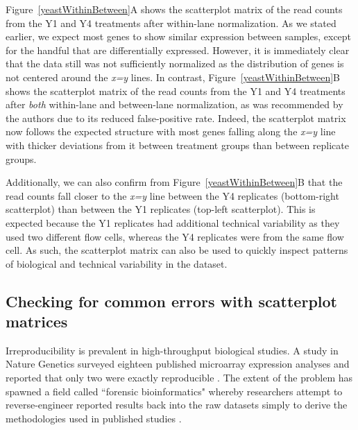 \documentclass{bioinfo}
\begin{document}
Figure~\ref{yeastWithinBetween}A shows the scatterplot matrix of the read counts from the Y1 and Y4 treatments after within-lane normalization. As we stated earlier, we expect most genes to show similar expression between samples, except for the handful that are differentially expressed. However, it is immediately clear that the data still was not sufficiently normalized as the distribution of genes is not centered around the \textit{x=y} lines. In contrast, Figure~\ref{yeastWithinBetween}B shows the scatterplot matrix of the read counts from the Y1 and Y4 treatments after \textit{both} within-lane and between-lane normalization, as was recommended by the authors due to its reduced false-positive rate. Indeed, the scatterplot matrix now follows the expected structure with most genes falling along the \textit{x=y} line with thicker deviations from it between treatment groups than between replicate groups.

Additionally, we can also confirm from Figure~\ref{yeastWithinBetween}B that the read counts fall closer to the \textit{x=y} line between the Y4 replicates (bottom-right scatterplot) than between the Y1 replicates (top-left scatterplot). This is expected because the Y1 replicates had additional technical variability as they used two different flow cells, whereas the Y4 replicates were from the same flow cell. As such, the scatterplot matrix can also be used to quickly inspect patterns of biological and technical variability in the dataset.

\subsection{Checking for common errors with scatterplot matrices}

Irreproducibility is prevalent in high-throughput biological studies. A study in Nature Genetics surveyed eighteen published microarray expression analyses and reported that only two were exactly reproducible \citep{Ioannidis}. The extent of the problem has spawned a field called ``forensic bioinformatics" whereby researchers attempt to reverse-engineer reported results back into the raw datasets simply to derive the methodologies used in published studies \citep{Baggerly}.
\end{document}
